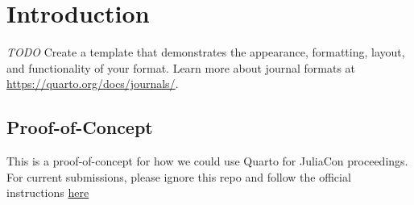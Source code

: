 \documentclass{juliacon}
\begin{document}
\hypertarget{sec-intro}{%
\section{Introduction}\label{sec-intro}}

\emph{TODO} Create a template that demonstrates the appearance,
formatting, layout, and functionality of your format. Learn more about
journal formats at \url{https://quarto.org/docs/journals/}.

\hypertarget{proof-of-concept}{%
\subsection{Proof-of-Concept}\label{proof-of-concept}}

This is a proof-of-concept for how we could use Quarto for JuliaCon
proceedings. For current submissions, please ignore this repo and follow
the official instructions
\href{https://github.com/JuliaCon/JuliaConSubmission.jl}{here}
\end{document}
